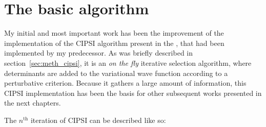 \documentclass[./thesis.tex]{subfiles}
\begin{document}
\label{chap:CIPSI}


\section{The basic algorithm}
My initial and most important work has been the improvement of the implementation of the CIPSI algorithm present in the \QP, that had been implemented by my predecessor.\cite{giner:tel-01077016} As was briefly described in section~\ref{sec:meth_cipsi}, it is an \emph{on the fly} iterative selection algorithm, where determinants are added to the variational wave function according to a perturbative criterion. Because it gathers a large amount of information, this CIPSI implementation has been the basis for other subsequent works presented in the next chapters.

The $n^\text{th}$ iteration of CIPSI can be described like so:
\end{document}
